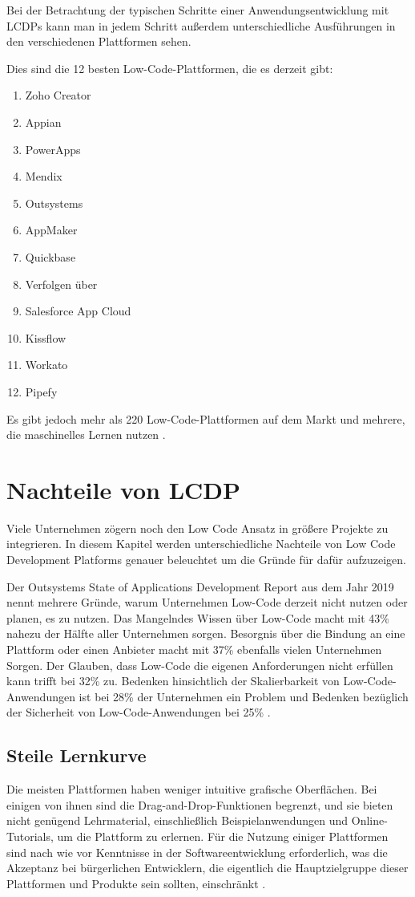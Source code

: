 \documentclass[12pt]{article} %
\begin{document}
	Bei der Betrachtung der typischen Schritte einer Anwendungsentwicklung mit LCDPs kann man in jedem Schritt außerdem unterschiedliche Ausführungen in den verschiedenen Plattformen sehen. \newline
	
	Dies sind die 12 besten Low-Code-Plattformen, die es derzeit gibt: 
	\begin{enumerate}
	\item Zoho Creator
	\item Appian
	\item PowerApps
	\item Mendix
	\item Outsystems
	\item AppMaker
	\item Quickbase
	\item Verfolgen über
	\item Salesforce App Cloud
	\item Kissflow
	\item Workato
	\item Pipefy
	\end{enumerate}
	Es gibt jedoch mehr als 220 Low-Code-Plattformen auf dem Markt und mehrere, die maschinelles Lernen nutzen \cite{KevinShuler.2023}. 
	
	
	\section{Nachteile von LCDP}
	Viele Unternehmen zögern noch den Low Code Ansatz in größere Projekte zu integrieren. In diesem Kapitel werden unterschiedliche Nachteile von Low Code Development Platforms genauer beleuchtet um die Gründe für dafür aufzuzeigen. \newline
	
	Der Outsystems State of Applications Development Report aus dem Jahr 2019 nennt mehrere Gründe, warum Unternehmen Low-Code derzeit nicht nutzen oder planen, es zu nutzen. Das Mangelndes Wissen über Low-Code macht mit 43\% nahezu der Hälfte aller Unternehmen sorgen. Besorgnis über die Bindung an eine Plattform oder einen Anbieter macht mit 37\% ebenfalls vielen Unternehmen Sorgen. Der Glauben, dass Low-Code die eigenen Anforderungen nicht erfüllen kann trifft bei 32\% zu. Bedenken hinsichtlich der Skalierbarkeit von Low-Code-Anwendungen ist bei 28\% der Unternehmen ein Problem und Bedenken bezüglich der Sicherheit von Low-Code-Anwendungen bei 25\% \cite{KevinShuler.2023}.
			
	\subsection{Steile Lernkurve}
	Die meisten Plattformen haben weniger intuitive grafische Oberflächen. Bei einigen von ihnen sind die Drag-and-Drop-Funktionen begrenzt, und sie bieten nicht genügend Lehrmaterial, einschließlich Beispielanwendungen und Online-Tutorials, um die Plattform zu erlernen. 
	Für die Nutzung einiger Plattformen sind nach wie vor Kenntnisse in der Softwareentwicklung erforderlich, was die Akzeptanz bei bürgerlichen Entwicklern, die eigentlich die Hauptzielgruppe dieser Plattformen und Produkte sein sollten, einschränkt \cite{Alamin.2023}.
	
\end{document}
